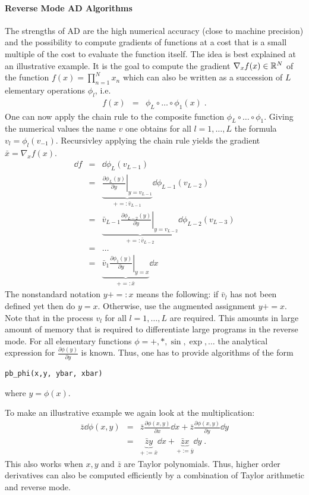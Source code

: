 \documentclass[a4paper,12pt,twoside]{article}
\begin{document}
\paragraph{Reverse Mode AD Algorithms}
The strengths of AD are the high numerical accuracy (close to machine precision) and the possibility to compute gradients of functions at a cost that is a small multiple of the cost to evaluate the function itself.
The idea is best explained at an illustrative example. It is the goal to compute the gradient $\nabla_x f(x) \in {\mathbb R}^N$ of the function $f(x) = \prod_{n=1}^N x_n$ which can also be written as a succession of $L$ elementary operations $\phi_l$, i.e.
\begin{eqnarray*}
f(x) &=&  \phi_L \circ \dots \circ \phi_1 (x) \;.
\end{eqnarray*}
One can now apply the chain rule to the composite function  $\phi_L \circ \dots \circ \phi_1$. Giving the numerical values the name $v$ one obtains for all $l=1,\dots,L$ the formula $v_l = \phi_l(v_{-1})$.
Recursivley applying the chain rule yields the gradient $\bar x = \nabla_x f(x)$.
\begin{eqnarray*}
\dd f &=& \dd \phi_L ( v_{L-1} ) \\
&=& \underbrace{ \left. \frac{\partial \phi_L(y)}{\partial y} \right|_{y = v_{L-1}}}_{ +=: \bar v_{L-1}}  \dd \phi_{L-1}(v_{L-2}) \\
&=&  \underbrace{ \bar v_{L-1} \left. \frac{\partial \phi_{L-2}(y)}{\partial y} \right|_{y = v_{L-2}}}_{ +=: \bar v_{L-2}}  \dd \phi_{L-2}(v_{L-3}) \\
&=& \dots \\
&=&  \underbrace{ \bar v_{1} \left. \frac{\partial \phi_{1}(y)}{\partial y} \right|_{y = x}}_{ +=: \bar x}  \dd x 
\end{eqnarray*}
The nonstandard notation $ y +=: x$ means the following: if $\bar v_l$ has not been defined yet then do $y = x$. Otherwise, use the augmented assignment $y += x$.
Note that in the process $v_l$ for all $l=1,\dots,L$ are required. This amounts in large amount of memory that is required to differentiate large programs in the reverse mode. For all elementary functions $\phi = +,*,\sin,\exp, \dots$ the analytical expression for $\frac{\partial \phi(y)}{\partial y}$ is known. Thus, one has to provide algorithms of the form
\begin{verbatim}
pb_phi(x,y, ybar, xbar)
\end{verbatim}
where $y = \phi(x)$.

To make an illustrative example we again look at the multiplication:
\begin{eqnarray*}
\bar z \dd \phi(x,y) &=& \bar z \frac{\partial \phi(x,y)}{\partial x} \dd x + \bar z \frac{\partial \phi(x,y)}{\partial y} \dd y \\
&=& \underbrace{\bar z y}_{ +:= \bar x} \dd x + \underbrace{\bar z x}_{ +:= \bar y} \dd y \;.
\end{eqnarray*}
This also works when $x,y$ and $\bar z$ are Taylor polynomials. Thus, higher order derivatives can also be computed efficiently by a combination of Taylor arithmetic and reverse mode.
\end{document}
